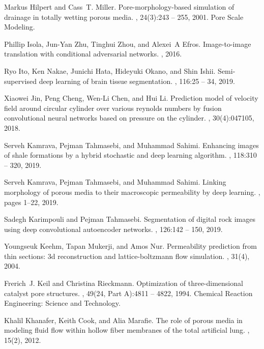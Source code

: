 \documentclass{article}
\begin{document}
\begin{thebibliography}{10}
Markus Hilpert and Cass~T. Miller.
\newblock Pore-morphology-based simulation of drainage in totally wetting
  porous media.
, 24(3):243 -- 255, 2001.
\newblock Pore Scale Modeling.

Phillip Isola, Jun-Yan Zhu, Tinghui Zhou, and Alexei~A Efros.
\newblock Image-to-image translation with conditional adversarial networks.
, 2016.

Ryo Ito, Ken Nakae, Junichi Hata, Hideyuki Okano, and Shin Ishii.
\newblock Semi-supervised deep learning of brain tissue segmentation.
, 116:25 -- 34, 2019.

Xiaowei Jin, Peng Cheng, Wen-Li Chen, and Hui Li.
\newblock Prediction model of velocity field around circular cylinder over
  various reynolds numbers by fusion convolutional neural networks based on
  pressure on the cylinder.
, 30(4):047105, 2018.

Serveh Kamrava, Pejman Tahmasebi, and Muhammad Sahimi.
\newblock Enhancing images of shale formations by a hybrid stochastic and deep
  learning algorithm.
, 118:310 -- 320, 2019.

Serveh Kamrava, Pejman Tahmasebi, and Muhammad Sahimi.
\newblock Linking morphology of porous media to their macroscopic permeability
  by deep learning.
, pages 1--22, 2019.

Sadegh Karimpouli and Pejman Tahmasebi.
\newblock Segmentation of digital rock images using deep convolutional
  autoencoder networks.
, 126:142 -- 150, 2019.

Youngseuk Keehm, Tapan Mukerji, and Amos Nur.
\newblock Permeability prediction from thin sections: 3d reconstruction and
  lattice-boltzmann flow simulation.
, 31(4), 2004.

Frerich~J. Keil and Christina Rieckmann.
\newblock Optimization of three-dimensional catalyst pore structures.
, 49(24, Part A):4811 -- 4822,
  1994.
\newblock Chemical Reaction Engineering: Science and Technology.

Khalil Khanafer, Keith Cook, and Alia Marafie.
\newblock The role of porous media in modeling fluid flow within hollow fiber
  membranes of the total artificial lung.
, 15(2), 2012.


\end{thebibliography}
\end{document}

